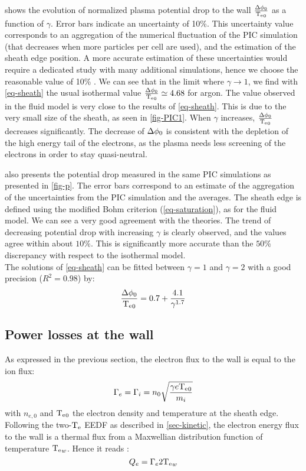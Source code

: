  shows the evolution of normalized plasma potential drop to the wall $\frac{\Delta \phi_0}{\mathrm{T_e}_0}$ as a function of $\gamma$.
{  Error bars indicate an uncertainty of 10\%.
This uncertainty value corresponds to an aggregation of the numerical fluctuation of the PIC simulation (that decreases when more particles per cell are used), and the estimation of the sheath edge position.
A more accurate estimation of these uncertainties would require a dedicated study with many additional simulations, hence we choose the reasonable value of 10\% \citep{turner2013}.}
We can see that in the limit where $\gamma \rightarrow 1$, we find with \cref{eq-sheath} the usual isothermal value $\frac{\Delta \phi_0}{\mathrm{T_e}_0}  \simeq 4.68$ for argon.
The value observed in the fluid model is very close to the results of \cref{eq-sheath}.
This is due to the very small size of the sheath, as seen in \cref{fig-PIC1}.
When $\gamma$ increases, $\frac{\Delta \phi_0}{\mathrm{T_e}_0}$ decreases significantly.
The decrease of $\Delta \phi_0$ is consistent with the depletion of the high energy tail of the electrons, as the plasma needs less screening of the electrons in order to stay quasi-neutral.

 also presents the potential drop measured in the same PIC simulations as presented in \cref{fig-p}.
The error bars correspond to an estimate of the aggregation of the uncertainties from the PIC simulation and the averages.
The sheath edge is defined using the modified Bohm criterion (\cref{eq-saturation}), as for the fluid model.
We can see a very good agreement with the theories.
The trend of decreasing potential drop with increasing $\gamma$ is clearly observed, and the values agree within about $10\%$.
This is significantly more accurate than the $50$\% discrepancy with respect to the isothermal model.\\

The solutions of \cref{eq-sheath} can be fitted between $\gamma = 1$ and $\gamma = 2$ with a good precision ($R^2 = 0.98$) by:
\begin{equation}
  \label{eq-fit}
  \frac{\Delta \phi_0}{\mathrm{T_e}_0} = 0.7 + \frac{4.1}{\gamma^{1.7}}
\end{equation}

\subsection{Power losses at the wall}

As expressed in the previous section, the electron flux to the wall is equal to the ion flux:
\begin{equation}
  \Gamma_e = \Gamma_i =  n_0 \sqrt{\frac{\gamma e \mathrm{T_e}_0}{m_i}}
\end{equation}
with $n_{e,0}$ and $\mathrm{T_e}_0$ the electron density and temperature at the sheath edge.
Following the two-$\mathrm{T_e}$ EEDF as described in \cref{sec-kinetic}, the electron energy flux to the wall is a thermal flux from a Maxwellian distribution function of temperature  $\mathrm{T_e}_w$.
Hence it reads \cite{chabert2011}:
\begin{equation}
  \label{eq-maxflux}
  Q_e = \Gamma_e 2 \mathrm{T_e}_{w}
\end{equation}


